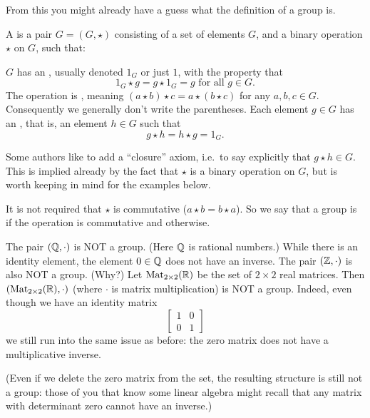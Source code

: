 From this you might already have a guess what the definition of a group is.
\begin{definition}
	A  is a pair $G = (G, \star)$
	consisting of a set of elements $G$, and a binary operation $\star$ on $G$, such that:
	\begin{itemize}
		\ii $G$ has an , usually denoted $1_G$
		or just $1$, with the property that
		\[ 1_G \star g = g \star 1_G = g \text{ for all $g \in G$}. \]
		\ii The operation is , meaning
		$(a \star b) \star c = a \star (b \star c)$
		for any $a,b,c \in G$.
		Consequently we generally don't write the parentheses.
		\ii Each element $g \in G$ has an , that is, an element $h \in G$ such that \[ g \star h = h \star g = 1_G. \]
	\end{itemize}
	\label{def:group}
\end{definition}
\begin{remark}
	Some authors like to add a ``closure'' axiom,
	i.e.\ to say explicitly that $g \star h \in G$.
	This is implied already by the fact that $\star$
	is a binary operation on $G$,
	but is worth keeping in mind for the examples below.
\end{remark}

\begin{remark}
	It is not required that $\star$ is commutative ($a \star b = b \star a$).
	So we say that a group is  if the operation is
	commutative and  otherwise.
\end{remark}



\begin{example}
	\listhack
	\begin{itemize}
		\ii The pair $(\mathbb Q, \cdot)$ is NOT a group.
		(Here $\mathbb Q$ is rational numbers.)
		While there is an identity element, the element $0 \in \mathbb Q$
		does not have an inverse.
		\ii The pair $(\mathbb Z, \cdot)$ is also NOT a group. (Why?)
		\ii Let $\mathrm{Mat}_{2 \times 2}(\mathbb R)$ be the set of $2 \times 2$ real matrices.
		Then $(\mathrm{Mat}_{2 \times 2}(\mathbb R), \cdot)$
		(where $\cdot$ is matrix multiplication) is NOT a group.
		Indeed, even though we have an identity matrix
		\[ 
			\begin{bmatrix}
				1 & 0 \\ 0 & 1
			\end{bmatrix}
		\]
		we still run into the same issue as before:
		the zero matrix does not have a multiplicative inverse.

		(Even if we delete the zero matrix from the set,
		the resulting structure is still not a group:
		those of you that know some linear algebra
		might recall that any matrix with determinant zero
		cannot have an inverse.)
	\end{itemize}
\end{example}


